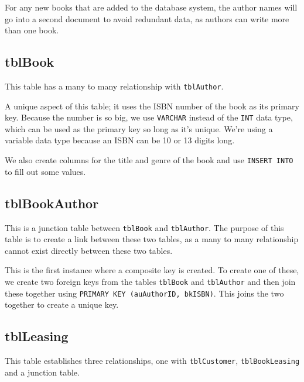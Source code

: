 \documentclass[11pt,a4paper]{scrartcl}
\begin{document}
	For any new books that are added to the database system, the author names will go into a second document to avoid redundant data, as authors can write more than one book.
	
	\subsection{tblBook}\label{tblbook}
	
	This table has a many to many relationship with \texttt{tblAuthor}.
	
	
	
	A unique aspect of this table; it uses the ISBN number of the book as its primary key. Because the number is so big, we use \texttt{VARCHAR} instead of the \texttt{INT} data type, which can be used as the primary key so long as it's unique. We're using a variable data type because an ISBN can be 10 or 13 digits long.
	
	We also create columns for the title and genre of the book and use \texttt{INSERT INTO} to fill out some values.
	
	\subsection{tblBookAuthor}\label{tblbookauthor}
	
	This is a junction table between \texttt{tblBook} and \texttt{tblAuthor}. The purpose of this table is to create a link between these two tables, as a many to many relationship cannot exist directly between these two tables.
	
	
	
	This is the first instance where a composite key is created. To create one of these, we create two foreign keys from the tables \texttt{tblBook} and \texttt{tblAuthor} and then join these together using \texttt{PRIMARY KEY (auAuthorID, bkISBN)}. This joins the two together to create a unique key.
	
	\subsection{tblLeasing}\label{tblleasing}
	
	This table establishes three relationships, one with \texttt{tblCustomer}, \texttt{tblBookLeasing} and a junction table.
	
	
	
\end{document}

